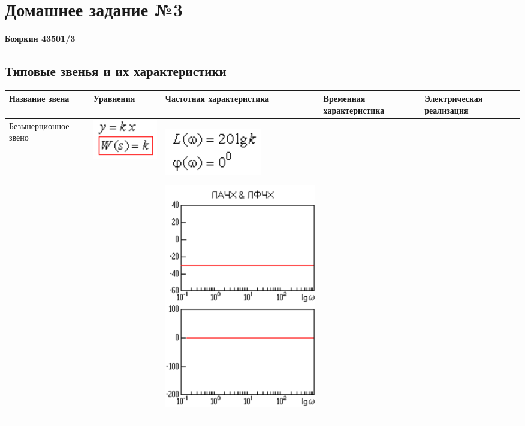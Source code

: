 \documentclass[14pt,a4paper,report]{report}
\begin{document}
\chapter{Домашнее задание №3}

\subsubsection{Бояркин 43501/3}

\section{Типовые звенья и их характеристики}

\begin{table}[h!]
	\centering
	\bgroup
	\def\arraystretch{3}
	\begin{tabular}{ | m{3cm} | m{2.5cm} | m{4.5cm} | m{2.5cm} | m{2.5cm} }
		\hline
		Название звена & Уравнения & Частотная характеристика & Временная характеристика & Электрическая реализация \\ \hline
		Безынерционное звено
		&
		\begin{minipage}{.3\textwidth}
			\includegraphics[scale = 0.5]{images/1_2.png}
		\end{minipage}
		&
		\begin{minipage}{.3\textwidth}
			\includegraphics[scale = 0.5]{images/1_3_f.png}
		\end{minipage}
		\begin{minipage}{.3\textwidth}
			\includegraphics[scale = 0.5]{images/1_3.png}

\end{minipage}
\end{tabular}
\end{table}
\end{document}
